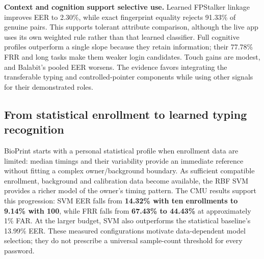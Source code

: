 \documentclass[10pt,a4paper]{article}
\begin{document}
\textbf{Context and cognition support selective use.} Learned FPStalker linkage improves EER to 2.30\%, while exact fingerprint equality rejects 91.33\% of genuine pairs. This supports tolerant attribute comparison, although the live app uses its own weighted rule rather than that learned classifier. Full cognitive profiles outperform a single slope because they retain information; their 77.78\% FRR and long tasks make them weaker login candidates. Touch gains are modest, and Balabit's pooled EER worsens. The evidence favors integrating the transferable typing and controlled-pointer components while using other signals for their demonstrated roles.

\newpage
\begingroup
\setlength{\parskip}{2.5pt}
\subsection{From statistical enrollment to learned typing recognition}
BioPrint starts with a personal statistical profile when enrollment data are limited: median timings and their variability provide an immediate reference without fitting a complex owner/background boundary. As sufficient compatible enrollment, background and calibration data become available, the RBF SVM provides a richer model of the owner's timing pattern. The CMU results support this progression: SVM EER falls from \textbf{14.32\% with ten enrollments to 9.14\% with 100}, while FRR falls from \textbf{67.43\% to 44.43\%} at approximately 1\% FAR. At the larger budget, SVM also outperforms the statistical baseline's 13.99\% EER. These measured configurations motivate data-dependent model selection; they do not prescribe a universal sample-count threshold for every password.
\end{document}
